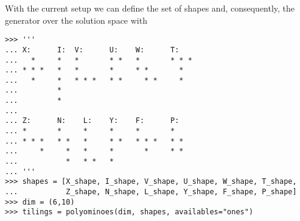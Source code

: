 With the current setup we can define the set of shapes and, consequently, the
generator over the solution space with
\begin{verbatim}
>>> '''
... X:      I:  V:      U:    W:      T:
...   *     *   *       * *   *       * * *
... * * *   *   *       *     * *       *
...   *     *   * * *   * *     * *     *
...         *
...         *
...
... Z:      N:    L:    Y:    F:      P:
... *       *     *     *     *       *
... * * *   * *   *     * *   * * *   * *
...     *     *   *     *       *     * *
...           *   * *   *
... '''
>>> shapes = [X_shape, I_shape, V_shape, U_shape, W_shape, T_shape,
...           Z_shape, N_shape, L_shape, Y_shape, F_shape, P_shape]
>>> dim = (6,10)
>>> tilings = polyominoes(dim, shapes, availables="ones")
\end{verbatim}
